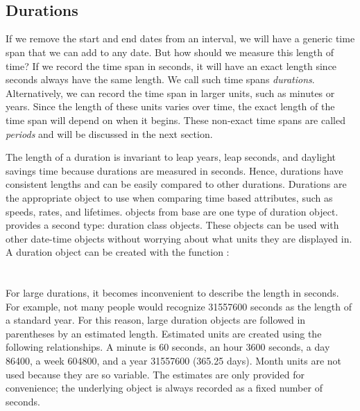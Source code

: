 \documentclass[article]{jss}
\begin{document}
\\
\\

\subsection{Durations}
\label{sec:durations}

If we remove the start and end dates from an interval, we will have a generic time span that we can add to any date. But how should we measure this length of time? If we record the time span in seconds, it will have an exact length since seconds always have the same length. We call such time spans \emph{durations}. Alternatively, we can record the time span in larger units, such as minutes or years. Since the length of these units varies over time, the exact length of the time span will depend on when it begins. These non-exact time spans are called \emph{periods} and will be discussed in the next section.

The length of a duration is invariant to leap years, leap seconds, and daylight savings time because durations are measured in seconds. Hence, durations have consistent lengths and can be easily compared to other durations. Durations are the appropriate object to use when comparing time based attributes, such as speeds, rates, and lifetimes.  objects from base  are one type of duration object.  provides a second type: duration class objects. These objects can be used with other date-time objects without worrying about what units they are displayed in. A duration object can be created with the function :\\

\\
\\

For large durations, it becomes inconvenient to describe the length in seconds. For example, not many people would recognize 31557600 seconds as the length of a standard year. For this reason, large duration objects are followed in parentheses by an estimated length. Estimated units are created using the following relationships. A minute is 60 seconds, an hour 3600 seconds, a day 86400, a week 604800, and a year 31557600 (365.25 days). Month units are not used because they are so variable. The estimates are only provided for convenience; the underlying object is always recorded as a fixed number of seconds. 
\end{document}
